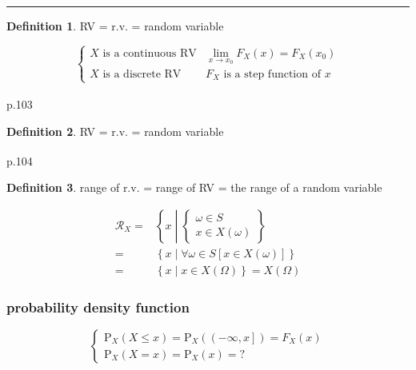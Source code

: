 \documentclass[
]{book}
\theoremstyle{definition}
\newtheorem{definition}{Definition}[chapter]
\theoremstyle{definition}
\theoremstyle{definition}
\theoremstyle{definition}
\theoremstyle{remark}
\begin{document}
\begin{center}\rule{0.5\linewidth}{0.5pt}\end{center}

\begin{definition}
\protect\hypertarget{def:unnamed-chunk-7}{}\label{def:unnamed-chunk-7}RV = r.v. = random variable
\end{definition}

\[
\begin{cases}
X\text{ is a continuous RV} & \lim\limits _{x\rightarrow x_{{\scriptscriptstyle 0}}}F_{{\scriptscriptstyle X}}\left(x\right)=F_{{\scriptscriptstyle X}}\left(x_{{\scriptscriptstyle 0}}\right)\\
X\text{ is a discrete RV} & F_{{\scriptscriptstyle X}}\text{ is a step function of }x
\end{cases}
\]

\textsuperscript{} p.103

\begin{definition}
\protect\hypertarget{def:unnamed-chunk-8}{}\label{def:unnamed-chunk-8}RV = r.v. = random variable
\end{definition}

\textsuperscript{} p.104

\begin{definition}
\protect\hypertarget{def:unnamed-chunk-9}{}\label{def:unnamed-chunk-9}range of r.v. = range of RV = the range of a random variable
\end{definition}

\[
\begin{aligned}
\mathcal{R}_{{\scriptscriptstyle X}}=&\left\{ x\middle|\begin{cases}
\omega\in S\\
x\in X\left(\omega\right)
\end{cases}\right\} \\=&\left\{ x\middle|\forall\omega\in S\left[x\in X\left(\omega\right)\right]\right\} \\=&\left\{ x\middle|x\in X\left(\Omega\right)\right\} =X\left(\Omega\right)
\end{aligned}
\]

\subsubsection{probability density function}\label{probability-density-function}

\[
\begin{cases}
\mathrm{P}_{{\scriptscriptstyle X}}\left(X\le x\right)=\mathrm{P}_{{\scriptscriptstyle X}}\left(\left(-\infty,x\right]\right)=F_{{\scriptscriptstyle X}}\left(x\right)\\
\mathrm{P}_{{\scriptscriptstyle X}}\left(X=x\right)=\mathrm{P}_{{\scriptscriptstyle X}}\left(x\right)=?
\end{cases}
\]
\end{document}
